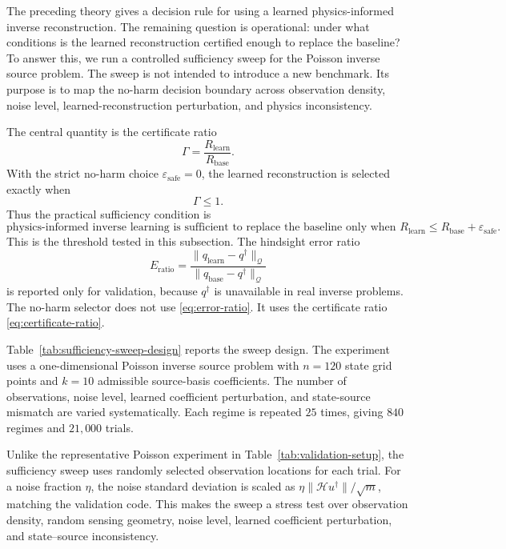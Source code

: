 \documentclass{article}
\numberwithin{equation}{section}
\theoremstyle{definition}
\begin{document}
The preceding theory gives a decision rule for using a learned physics-informed inverse reconstruction. The remaining question is operational: under what conditions is the learned reconstruction certified enough to replace the baseline? To answer this, we run a controlled sufficiency sweep for the Poisson inverse source problem. The sweep is not intended to introduce a new benchmark. Its purpose is to map the no-harm decision boundary across observation density, noise level, learned-reconstruction perturbation, and physics inconsistency.

The central quantity is the certificate ratio
\begin{equation}
\Gamma
=
\frac{R_{\mathrm{learn}}}{R_{\mathrm{base}}}.
\label{eq:certificate-ratio}
\end{equation}
With the strict no-harm choice \(\varepsilon_{\mathrm{safe}}=0\), the learned reconstruction is selected exactly when
\begin{equation}
\Gamma \le 1.
\label{eq:sufficiency-threshold}
\end{equation}
Thus the practical sufficiency condition is
\begin{equation}
\boxed{
\text{physics-informed inverse learning is sufficient to replace the baseline only when }
R_{\mathrm{learn}}\le R_{\mathrm{base}}+\varepsilon_{\mathrm{safe}}.
}
\label{eq:boxed-sufficiency-condition}
\end{equation}
This is the threshold tested in this subsection. The hindsight error ratio
\begin{equation}
E_{\mathrm{ratio}}
=
\frac{\|q_{\mathrm{learn}}-q^\dagger\|_{\mathcal Q}}
{\|q_{\mathrm{base}}-q^\dagger\|_{\mathcal Q}}
\label{eq:error-ratio}
\end{equation}
is reported only for validation, because \(q^\dagger\) is unavailable in real inverse problems. The no-harm selector does not use \eqref{eq:error-ratio}. It uses the certificate ratio \eqref{eq:certificate-ratio}.

Table~\ref{tab:sufficiency-sweep-design} reports the sweep design. The experiment uses a one-dimensional Poisson inverse source problem with \(n=120\) state grid points and \(k=10\) admissible source-basis coefficients. The number of observations, noise level, learned coefficient perturbation, and state-source mismatch are varied systematically. Each regime is repeated \(25\) times, giving \(840\) regimes and \(21{,}000\) trials.

Unlike the representative Poisson experiment in Table~\ref{tab:validation-setup}, the sufficiency sweep uses randomly selected observation locations for each trial. For a noise fraction \(\eta\), the noise standard deviation is scaled as \(\eta\|\mathcal H u^\dagger\|/\sqrt m\), matching the validation code. This makes the sweep a stress test over observation density, random sensing geometry, noise level, learned coefficient perturbation, and state--source inconsistency.
\end{document}
